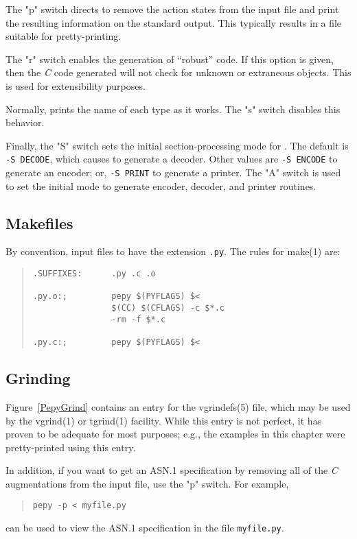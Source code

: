 The \switch"p" switch directs  to remove the action states from the
input file and print the resulting information on the standard output.
This typically results in a file suitable for pretty-printing.

The \switch"r" switch enables the generation of ``robust'' code.
If this option is given,
then the {\em C\/} code generated will not check for unknown or extraneous
objects.
This is used for extensibility purposes.

Normally,  prints the name of each type as it works.
The \switch"s" switch disables this behavior.

Finally,
the \switch"S" switch sets the initial section-processing mode for .
The default is \verb*"-S DECODE",
which causes  to generate a decoder.
Other values are \verb*"-S ENCODE" to generate an encoder;
or,
\verb*"-S PRINT" to generate a printer.
The \switch"A" switch is used to set the initial mode to generate encoder,
decoder, and printer routines.

\subsection	{Makefiles}
By convention,
input files to  have the extension \verb".py".
The rules for \man make(1) are:
\begin{quote}\small\begin{verbatim}
.SUFFIXES:      .py .c .o

.py.o:;         pepy $(PYFLAGS) $<
                $(CC) $(CFLAGS) -c $*.c
                -rm -f $*.c

.py.c:;         pepy $(PYFLAGS) $<
\end{verbatim}\end{quote}

\subsection	{Grinding}
Figure~\ref{PepyGrind} contains an entry for the \man vgrindefs(5) file,
which may be used by the \man vgrind(1) or \man tgrind(1) facility.
While this entry is not perfect,
it has proven to be adequate for most purposes;
e.g.,
the examples in this chapter were pretty-printed using this entry.

In addition,
if you want to get an ASN.1 specification
by removing all of the {\em C\/} augmentations from the  input file,
use the \switch"p" switch.
For example,
\begin{quote}\small\begin{verbatim}
pepy -p < myfile.py 
\end{verbatim}\end{quote}
can be used to view the ASN.1 specification in the file \verb"myfile.py".


